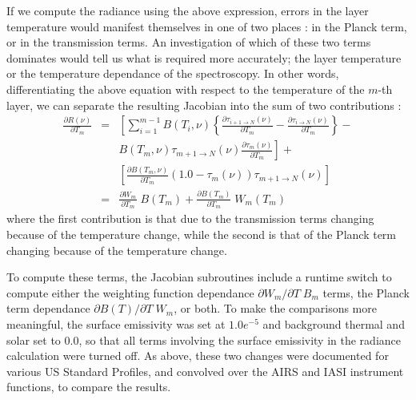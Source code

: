\documentclass[11pt]{article}
\begin{document}
If we compute the radiance using the above expression, errors in the layer 
temperature would manifest themselves in one of two places : in the Planck
term, or in the transmission terms. An investigation of which of these two 
terms dominates would tell us what is required more accurately; the layer 
temperature or the temperature dependance of the spectroscopy. In other words,
differentiating the above equation with respect to the temperature of the 
$m$-th layer, we can separate the resulting Jacobian into the sum of two
contributions :
\begin{eqnarray*}
\frac{\partial R(\nu)}{\partial T_{m}} & =  &
\left[ \sum_{i=1}^{m-1} B(T_{i},\nu) 
      \left\{ \frac{\partial \tau_{i+1 \rightarrow N }(\nu)}{\partial T_{m}} -
      \frac{\partial \tau_{i \rightarrow N}(\nu)}{\partial T_{m}} \right\}- 
\right. \\
 & &  \left .B(T_{m},\nu)\tau_{m+1\rightarrow N}(\nu)  
\frac{\partial \tau_{m}(\nu)}{\partial T_{m}} \right]+ \\
& & \left[ \frac{\partial B(T_{m},\nu)}{\partial T_{m}}
(1.0-\tau_{m}(\nu))\tau_{m+1 \rightarrow N}(\nu)\right] \\
 & =  & \frac{\partial W_{m}}{\partial T_{m}} \; B(T_{m}) +
     \frac{\partial B(T_{m})}{\partial T_{m}} \; W_{m}(T_{m})
\end{eqnarray*}
where the first contribution is that due to the transmission terms
changing because of the temperature change, while the second is that
of the Planck term changing because of the temperature change. 

To compute these terms, the Jacobian subroutines include a runtime switch to 
compute either the weighting function dependance
$\partial W_{m}/\partial T \; B_{m}$ terms, the Planck term dependance 
$\partial B(T)/\partial T \; W_{m}$, or both. To make the comparisons more 
meaningful, the surface emissivity was set at $1.0e^{-5}$ and background 
thermal and solar set to 0.0, so that all terms involving the 
surface emissivity in the radiance calculation were turned off.
As above, these two changes were documented for various US Standard
Profiles, and convolved over the AIRS and IASI instrument functions,
to compare the results.
\end{document}
